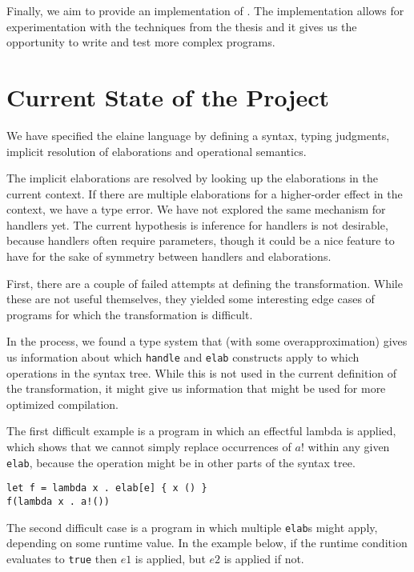\documentclass{article}
\begin{document}
Finally, we aim to provide an implementation of . The implementation allows for experimentation with the techniques from the thesis and it gives us the opportunity to write and test more complex programs.

\section{Current State of the Project}

We have specified the elaine language by defining a syntax, typing judgments, implicit resolution of elaborations and operational semantics.

The implicit elaborations are resolved by looking up the elaborations in the current context. If there are multiple elaborations for a higher-order effect in the context, we have a type error. We have not explored the same mechanism for handlers yet. The current hypothesis is inference for handlers is not desirable, because handlers often require parameters, though it could be a nice feature to have for the sake of symmetry between handlers and elaborations.

First, there are a couple of failed attempts at defining the transformation. While these are not useful themselves, they yielded some interesting edge cases of programs for which the transformation is difficult.

In the process, we found a type system that (with some overapproximation) gives us information about which \lstinline|handle| and \lstinline|elab| constructs apply to which operations in the syntax tree. While this is not used in the current definition of the transformation, it might give us information that might be used for more optimized compilation.

The first difficult example is a program in which an effectful lambda is applied, which shows that we cannot simply replace occurrences of $a!$ within any given \lstinline|elab|, because the operation might be in other parts of the syntax tree.

\begin{lstlisting}
let f = lambda x . elab[e] { x () }
f(lambda x . a!())
\end{lstlisting}

The second difficult case is a program in which multiple \lstinline|elab|s might apply, depending on some runtime value. In the example below, if the runtime condition evaluates to \lstinline|true| then $e1$ is applied, but $e2$ is applied if not.
\end{document}
